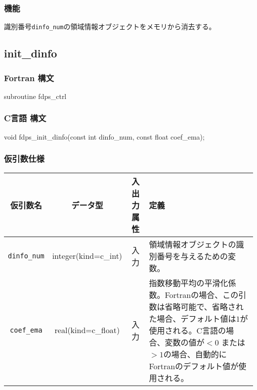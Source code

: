 \subsubsection*{機能}
識別番号\texttt{dinfo\_num}の領域情報オブジェクトをメモリから消去する。
\clearpage

\subsection{init\_dinfo}
\subsubsection*{Fortran 構文}
\begin{screen}
\begin{spverbatim}
subroutine fdps_ctrl%
\end{spverbatim}
\end{screen}

\subsubsection*{C言語 構文}
\begin{screen}
\begin{spverbatim}
void fdps_init_dinfo(const int dinfo_num,
                     const float coef_ema);
\end{spverbatim}
\end{screen}

\subsubsection*{仮引数仕様}
\begin{table}[h]
\begin{tabularx}{\linewidth}{cccX}
\toprule
\rowcolor{Snow2}
仮引数名 & データ型 & 入出力属性 & 定義 \\
\midrule
\texttt{dinfo\_num} & integer(kind=c\_int) & 入力 & 領域情報オブジェクトの識別番号を与えるための変数。\\
\texttt{coef\_ema} & real(kind=c\_float) & 入力 & 指数移動平均の平滑化係数。Fortranの場合、この引数は省略可能で、省略された場合、デフォルト値は$1$が使用される。C言語の場合、変数の値が$<0$ または $>1$の場合、自動的にFortranのデフォルト値が使用される。\\
\bottomrule
\end{tabularx}
\end{table}

